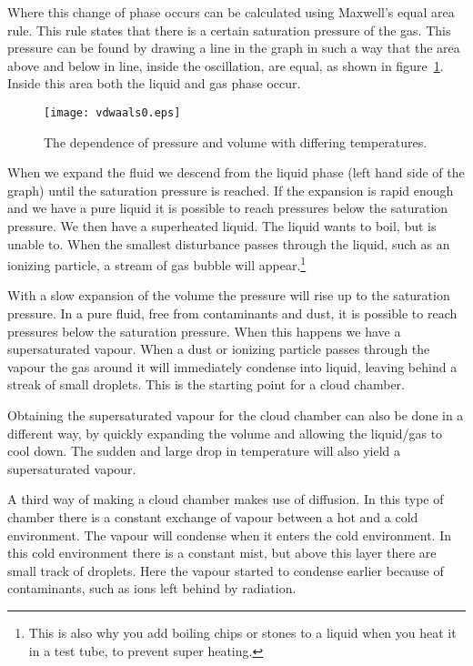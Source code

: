 Where this change of phase occurs can be calculated using Maxwell's equal area rule. This rule states that there is a certain saturation pressure of the gas. This pressure can be found by drawing a line in the graph in such a way that the area above and below in line, inside the oscillation, are equal, as shown in figure~\ref{fig:vdw0}. Inside this area both the liquid and gas phase occur. 

\begin{figure}\begin{center}
\texttt{[image: vdwaals0.eps]}%
\caption{The dependence of pressure and volume with differing temperatures.}\label{fig:vdw0}
\end{center}\end{figure}

When we expand the fluid we descend from the liquid phase (left hand side of the graph) until the saturation pressure is reached. If the expansion is rapid enough and we have a pure liquid it is possible to reach pressures below the saturation pressure. We then have a superheated liquid. The liquid wants to boil, but is unable to. When the smallest disturbance passes through the liquid, such as an ionizing particle, a stream of gas bubble will appear.\footnote{This is also why you add boiling chips or stones to a liquid when you heat it in a test tube, to prevent super heating.}

With a slow expansion of the volume the pressure will rise up to the saturation pressure. In a pure fluid, free from contaminants and dust, it is possible to reach pressures below the saturation pressure. When this happens we have a supersaturated vapour. When a dust or ionizing particle passes through the vapour the gas around it will immediately condense into liquid, leaving behind a streak of small droplets. This is the starting point for a cloud chamber.

Obtaining the supersaturated vapour for the cloud chamber can also be done in a different way, by quickly expanding the volume and allowing the liquid/gas to cool down. The sudden and large drop in temperature will also yield a supersaturated vapour.

A third way of making a cloud chamber makes use of diffusion. In this type of chamber there is a constant exchange of vapour between a hot and a cold environment. The vapour will condense when it enters the cold environment. In this cold environment there is a constant mist, but above this layer there are small track of droplets. Here the vapour started to condense earlier because of contaminants, such as ions left behind by radiation.

